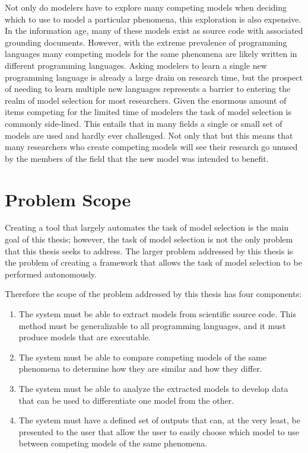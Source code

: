  Not only do modelers have to explore many competing models when deciding which to use to model a particular phenomena, this exploration is also expensive. In the information age, many of these models exist as source code with associated grounding documents. However, with the extreme prevalence of programming languages many competing models for the same phenomena are likely written in different programming languages. Asking modelers to learn a single new programming language is already a large drain on research time, but the prospect of needing to learn multiple new languages represents a barrier to entering the realm of model selection for most researchers. Given the enormous amount of items competing for the limited time of modelers the task of model selection is commonly side-lined. This entails that in many fields a single or small set of models are used and hardly ever challenged. Not only that but this means that many researchers who create competing models will see their research go unused by the members of the field that the new model was intended to benefit.

\section{Problem Scope\label{sec:prob_scope}}
Creating a tool that largely automates the task of model selection is the main goal of this thesis; however, the task of model selection is not the only problem that this thesis seeks to address. The larger problem addressed by this thesis is the problem of creating a framework that allows the task of model selection to be performed autonomously.

Therefore the scope of the problem addressed by this thesis has four components:
\begin{enumerate}
  \item The system must be able to extract models from scientific source code. This method must be generalizable to all programming languages, and it must produce models that are executable.
  \item The system must be able to compare competing models of the same phenomena to determine how they are similar and how they differ.
  \item The system must be able to analyze the extracted models to develop data that can be used to differentiate one model from the other.
  \item The system must have a defined set of outputs that can, at the very least, be presented to the user that allow the user to easily choose which model to use between competing models of the same phenomena.
\end{enumerate}

